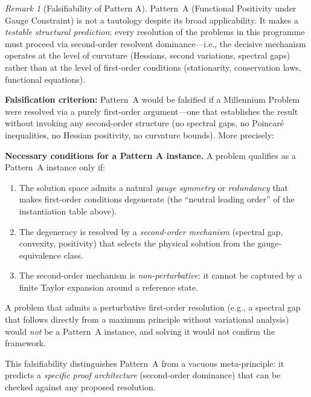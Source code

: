 \documentclass[12pt,a4paper]{article}
\theoremstyle{definition}
\theoremstyle{remark}
\newtheorem{remark}[theorem]{Remark}
\begin{document}
\begin{remark}[Falsifiability of Pattern A]
\label{rem:pattern-a-falsifiability}
Pattern~A (Functional Positivity under Gauge Constraint) is not a tautology despite its broad applicability. It makes a \emph{testable structural prediction}: every resolution of the problems in this programme must proceed via second-order resolvent dominance---i.e., the decisive mechanism operates at the level of curvature (Hessians, second variations, spectral gaps) rather than at the level of first-order conditions (stationarity, conservation laws, functional equations).

\textbf{Falsification criterion:} Pattern~A would be falsified if a Millennium Problem were resolved via a purely first-order argument---one that establishes the result without invoking any second-order structure (no spectral gaps, no Poincar\'e inequalities, no Hessian positivity, no curvature bounds). More precisely:

\textbf{Necessary conditions for a Pattern A instance.} A problem qualifies as a Pattern~A instance only if:
\begin{enumerate}
\item[(PA1)] The solution space admits a natural \emph{gauge symmetry} or \emph{redundancy} that makes first-order conditions degenerate (the ``neutral leading order'' of the instantiation table above).
\item[(PA2)] The degeneracy is resolved by a \emph{second-order mechanism} (spectral gap, convexity, positivity) that selects the physical solution from the gauge-equivalence class.
\item[(PA3)] The second-order mechanism is \emph{non-perturbative}: it cannot be captured by a finite Taylor expansion around a reference state.
\end{enumerate}

A problem that admits a perturbative first-order resolution (e.g., a spectral gap that follows directly from a maximum principle without variational analysis) would \emph{not} be a Pattern~A instance, and solving it would not confirm the framework.

This falsifiability distinguishes Pattern~A from a vacuous meta-principle: it predicts a \emph{specific proof architecture} (second-order dominance) that can be checked against any proposed resolution.
\end{remark}
\end{document}
